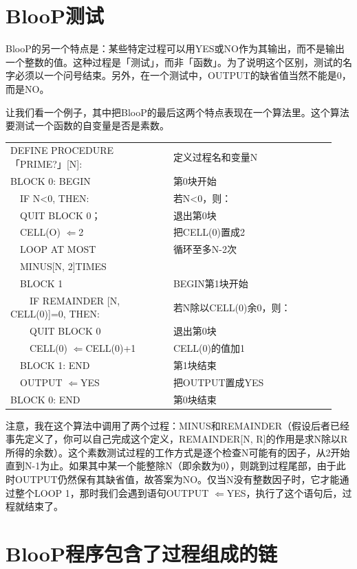 \documentclass[
  12pt,
  twoside,
  openright,
  oldfontcommands,
]{memoir}
\begin{document}
\section{BlooP测试}

BlooP的另一个特点是：某些特定过程可以用YES或NO作为其输出，而不是输出一个整数的值。这种过程是「测试」，而非「函数」。为了说明这个区别，测试的名字必须以一个问号结束。另外，在一个测试中，OUTPUT的缺省值当然不能是0，而是NO。

让我们看一个例子，其中把BlooP的最后这两个特点表现在一个算法里。这个算法要测试一个函数的自变量是否是素数。

\begin{longtable}[]{>{\raggedright\arraybackslash}p{0.47\linewidth} >{\raggedright\arraybackslash}p{0.47\linewidth}}
\toprule\noalign{}
\endhead
\bottomrule\noalign{}
\endlastfoot
DEFINE PROCEDURE 「PRIME?」{[}N{]}: & 定义过程名和变量N \\
BLOCK 0: BEGIN & 第0块开始 \\
　IF N\textless0, THEN: & 若N\textless0，则： \\
　QUIT BLOCK 0； & 退出第0块 \\
　CELL(O) $\Leftarrow$2 & 把CELL(0)置成2 \\
　LOOP AT MOST & 循环至多N-2次 \\
　MINUS{[}N, 2{]}TIMES & \\
　BLOCK 1 & BEGIN第1块开始 \\
　　IF REMAINDER {[}N, CELL(0){]}=0, THEN: & 若N除以CELL(0)余0，则： \\
　　QUIT BLOCK 0 & 退出第0块 \\
　　CELL(0) $\Leftarrow$CELL(0)+1 & CELL(0)的值加1 \\
　BLOCK 1: END & 第1块结束 \\
　OUTPUT $\Leftarrow$YES & 把OUTPUT置成YES \\
BLOCK 0: END & 第0块结束 \\
\end{longtable}

注意，我在这个算法中调用了两个过程：MINUS和REMAINDER（假设后者已经事先定义了，你可以自己完成这个定义，REMAINDER{[}N,
R{]}的作用是求N除以R所得的余数）。这个素数测试过程的工作方式是逐个检查N可能有的因子，从2开始直到N-1为止。如果其中某一个能整除N（即余数为0），则跳到过程尾部，由于此时OUTPUT仍然保有其缺省值，故答案为NO。仅当N没有整数因子时，它才能通过整个LOOP
1，那时我们会遇到语句OUTPUT $\Leftarrow$YES，执行了这个语句后，过程就结束了。

\section{BlooP程序包含了过程组成的链}
\end{document}
